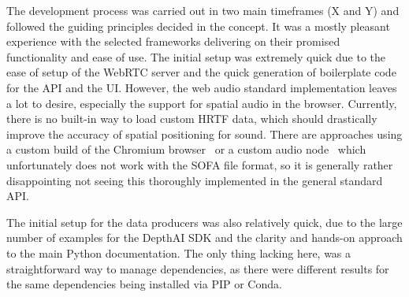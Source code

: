 The development process was carried out in two main timeframes (X and Y) and followed the guiding principles decided in the concept.
It was a mostly pleasant experience with the selected frameworks delivering on their promised functionality and ease of use.
The initial setup was extremely quick due to the ease of setup of the WebRTC server and the quick generation of boilerplate code for the \ac{API} and the \ac{UI}.
However, the web audio standard implementation leaves a lot to desire, especially the support for spatial audio in the browser.
Currently, there is no built-in way to load custom \ac{HRTF} data, which should drastically improve the accuracy of spatial positioning for sound.
There are approaches using a custom build of the Chromium browser~\parencite{chromiumCustomHrtf} or a custom audio node~\parencite{customHrtfAudioNode} which unfortunately does not work with the \ac{SOFA} file format, so it is generally rather disappointing not seeing this thoroughly implemented in the general standard \ac{API}.

The initial setup for the data producers was also relatively quick, due to the large number of examples for the DepthAI \ac{SDK} and the clarity and hands-on approach to the main Python documentation.
The only thing lacking here, was a straightforward way to manage dependencies, as there were different results for the same dependencies being installed via PIP or Conda.


